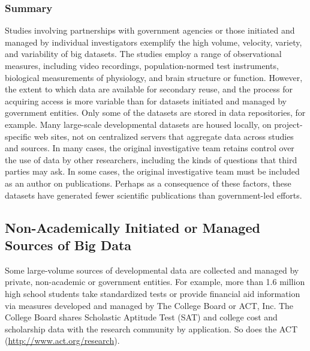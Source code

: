 \documentclass[letterpaper,man,apacite,natbib]{apa6}
\begin{document}
\subsubsection{Summary}
Studies involving partnerships with government agencies or those initiated and managed by individual investigators exemplify the high volume, velocity, variety, and variability of big datasets.
The studies employ a range of observational measures, including video recordings, population-normed test instruments, biological measurements of physiology, and brain structure or function.
However, the extent to which data are available for secondary reuse, and the process for acquiring access is more variable than for datasets initiated and managed by government entities.
Only some of the datasets are stored in data repositories, for example.
Many large-scale developmental datasets are housed locally, on project-specific web sites, not on centralized servers that aggregate data across studies and sources.
In many cases, the original investigative team retains control over the use of data by other researchers, including the kinds of questions that third parties may ask.
In some cases, the original investigative team must be included as an author on publications.
Perhaps as a consequence of these factors, these datasets have generated fewer scientific publications than government-led efforts.

\subsection{Non-Academically Initiated or Managed Sources of Big Data}
Some large-volume sources of developmental data are collected and managed by private, non-academic or government entities.
For example, more than 1.6 million high school students \cite{lewin_more_2013} take standardized tests or provide financial aid information via measures developed and managed by The College Board or ACT, Inc.
The College Board shares Scholastic Aptitude Test (SAT) and college cost and scholarship data with the research community by application.
So does the ACT (\url{http://www.act.org/research}).
\end{document}
